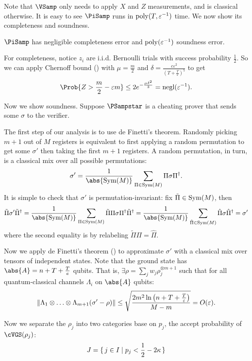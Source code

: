 Note that $\VSamp$ only needs to apply $X$ and $Z$ measurements, and is classical otherwise.
It is easy to see $\PiSamp$ runs in $\operatorname*{\operatorname{poly}}(T, \varepsilon^{-1})$ time.
We now show its completeness and soundness.

\begin{thm}
    \label{QPIP1thm}
	$\PiSamp$ has negligible completeness error and $\operatorname*{\operatorname{poly}}(\varepsilon^{-1})$ soundness error.
\end{thm}
\begin{prf}
	For completeness, notice $z_i$ are i.i.d. Bernoulli trials with success probability $\frac{1}{2}$.
	So we can apply Chernoff bound () with $\mu=\frac{m}{2}$ and $\delta=\frac{c\varepsilon^2}{\left(T+\frac{T}{\varepsilon}\right)^5}$ to get
	$$\Prob{Z>\frac{m}{2}-\varepsilon m}\leq2e^{-\frac{\mu\delta^2}{3}}=\negl(\varepsilon^{-1}).$$

	Now we show soundness.
	Suppose $\PSampstar$ is a cheating prover that sends some $\sigma$ to the verifier.

	The first step of our analysis is to use de Finetti's theorem.
	Randomly picking $m+1$ out of $M$ registers is equivalent to first applying a random permutation to get some $\sigma'$ then taking the first $m+1$ registers.
	A random permutation, in turn, is a classical mix over all possible permutations:
	$$\sigma'=\frac{1}{\abs{\Sym(M)}}\sum_{\Pi\in\Sym(M)}\Pi\sigma\Pi^\dagger.$$
	It is simple to check that $\sigma'$ is permutation-invariant:
	fix $\tilde{\Pi}\in\operatorname{Sym}(M)$, then
	$$\tilde{\Pi}\sigma'\tilde{\Pi}^\dagger
	=\frac{1}{\abs{\Sym(M)}}\sum_{\Pi\in\Sym(M)}\tilde{\Pi}\Pi\sigma\Pi^\dagger\tilde{\Pi}^\dagger
	=\frac{1}{\abs{\Sym(M)}}\sum_{\hat{\Pi}\in\Sym(M)}\hat{\Pi}\sigma\hat{\Pi}^\dagger
	=\sigma'$$
	where the second equality is by relabeling $\tilde{\Pi}\Pi=\hat{\Pi}$.

	Now we apply de Finetti's theorem () to approximate $\sigma'$ with a classical mix over tensors of independent states.
	Note that the ground state has $\abs{A}=n+T+\frac{T}{e}$ qubits.
	That is, $\exists\rho=\sum_j w_j\rho_j^{\otimes m+1}$ such that for all quantum-classical channels $\Lambda_i$ on $\abs{A}$ qubits:
	$$\left\lVert\Lambda_1\otimes\ldots\otimes\Lambda_{m+1}(\sigma'-\rho)\right\rVert
	\leq\sqrt{\frac{2m^2\ln\left(n+T+\frac{T}{\varepsilon}\right)}{M-m}}
	=O(\varepsilon).$$

	Now we separate the $\rho_j$ into two categories base on $p_j$, the accept probability of $\cVGS(\rho_j)$:
	$$J=\set{j\in I|p_j<\frac{1}{2}-2\kappa}$$


\end{prf}
